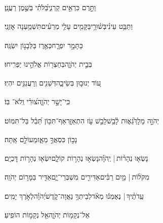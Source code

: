 \documentclass[12pt]{article}
\newcommand{\loc}[1]{\textsuperscript{\locf{#1}}}
\begin{document}
{\loc{ יא}~}‏וַתָּ֣רֶם כִּרְאֵ֣ים קַרְנִ֑י{\hfill}בַּ֝לֹּתִ֗י בְּשֶׁ֣מֶן רַעֲנָֽן׃\par

{\loc{ יב}~}‏וַתַּבֵּ֥ט עֵינִ֗י{\hfill}בְּשׁ֫וּרָ֥י\newline\hspace*{.5em}בַּקָּמִ֖ים עָלַ֥י מְרֵעִ֗ים{\hfill}תִּשְׁמַ֥עְנָה אׇזְנָֽי׃\par

{\loc{ יג}~}‏ כַּתָּמָ֣ר יִפְרָ֑ח{\hfill}כְּאֶ֖רֶז בַּלְּבָנ֣וֹן יִשְׂגֶּֽה׃\par

{\loc{ יד}~}‏ בְּבֵ֣ית יְהֹוָ֑ה{\hfill}בְּחַצְר֖וֹת אֱלֹהֵ֣ינוּ יַפְרִֽיחוּ׃\par

{\loc{ טו}~}‏ע֭וֹד יְנוּב֣וּן בְּשֵׂיבָ֑ה{\hfill}דְּשֵׁנִ֖ים וְֽרַעֲנַנִּ֣ים יִהְיֽוּ׃\par

{\loc{ טז}~}‏ כִּֽי־יָשָׁ֣ר יְהֹוָ֑ה{\hfill}צ֝וּרִ֗י וְֽלֹא־ בּֽוֹ׃\par\pend
\ledpb
\pstart[\subsection*{\textcolor{red}{פרק צג}}]\label{פרק צג}
{\loc{ א}~}‏יְהֹוָ֣ה מָלָךְ֮{\hfill}גֵּא֢וּת לָ֫בֵ֥שׁ\newline\hspace*{.5em}לָבֵ֣שׁ  עֹ֣ז הִתְאַזָּ֑ר{\hfill}אַף־תִּכּ֥וֹן תֵּ֝בֵ֗ל בַּל־תִּמּֽוֹט׃\par

{\loc{ ב}~}‏נָכ֣וֹן כִּסְאֲךָ֣ מֵאָ֑ז{\hfill}מֵעוֹלָ֣ם אָֽתָּה׃\par

{\loc{ ג}~}‏נָשְׂא֤וּ נְהָר֨וֹת | {\hfill}יְֽהֹוָ֗ה\newline\hspace*{.5em}נָשְׂא֣וּ נְהָר֣וֹת קוֹלָ֑ם{\hfill}יִשְׂא֖וּ נְהָר֣וֹת דׇּכְיָֽם׃\par

{\loc{ ד}~}‏מִקֹּל֨וֹת | {\hfill}מַ֤יִם רַבִּ֗ים\newline\hspace*{.5em}אַדִּירִ֣ים מִשְׁבְּרֵי־יָ֑ם{\hfill}אַדִּ֖יר בַּמָּר֣וֹם יְהֹוָֽה׃\par

{\loc{ ה}~}‏עֵֽדֹתֶ֨יךָ |  נֶאֶמְנ֬וּ מְאֹ֗ד{\hfill}לְבֵיתְךָ֥ נַאֲוָה־קֹ֑דֶשׁ\newline\hspace*{.5em}יְ֝הֹוָ֗ה{\hfill}לְאֹ֣רֶךְ יָמִֽים׃\par\pend
\ledpb
\pstart[\subsection*{\textcolor{red}{פרק צד}}]\label{פרק צד}
{\loc{ א}~}‏אֵל־נְקָמ֥וֹת יְהֹוָ֑ה{\hfill}אֵ֖ל נְקָמ֣וֹת הוֹפִֽיעַ׃\par
\end{document}
